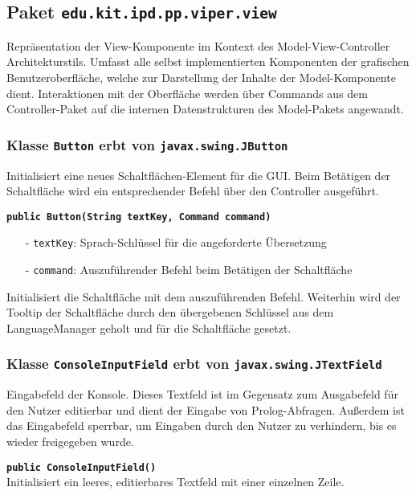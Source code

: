 \documentclass[parskip=full,11pt,twoside]{scrartcl}
\begin{document}
\subsection{Paket \texttt{edu.kit.ipd.pp.viper.view}}

Repräsentation der View-Komponente im Kontext des Model-View-Controller Architekturstils. Umfasst alle selbst implementierten Komponenten der grafischen Benutzeroberfläche, welche zur Darstellung der Inhalte der Model-Komponente dient. Interaktionen mit der Oberfläche werden über Commands aus dem Controller-Paket auf die internen Datenstrukturen des Model-Pakets angewandt.

\subsubsection{Klasse \texttt{Button} erbt von \texttt{javax.swing.JButton}}

Initialisiert eine neues Schaltflächen-Element für die GUI. Beim Betätigen der Schaltfläche wird ein entsprechender Befehl über den Controller ausgeführt.

\textbf{\texttt{public Button(String textKey, Command command)}}
\begin{itemize}[noitemsep]
	\item[-] \texttt{textKey}: Sprach-Schlüssel für die angeforderte Übersetzung
	\item[-] \texttt{command}: Auszuführender Befehl beim Betätigen der Schaltfläche
\end{itemize}
Initialisiert die Schaltfläche mit dem auszuführenden Befehl. Weiterhin wird der Tooltip der Schaltfläche durch den übergebenen Schlüssel aus dem LanguageManager geholt und für die Schaltfläche gesetzt.

\subsubsection{Klasse \texttt{ConsoleInputField} erbt von \texttt{javax.swing.JTextField}}

Eingabefeld der Konsole. Dieses Textfeld ist im Gegensatz zum Ausgabefeld für den Nutzer editierbar und dient der Eingabe von Prolog-Abfragen. Außerdem ist das Eingabefeld sperrbar, um Eingaben durch den Nutzer zu verhindern, bis es wieder freigegeben wurde.

\textbf{\texttt{public ConsoleInputField()}}\\
Initialisiert ein leeres, editierbares Textfeld mit einer einzelnen Zeile.
\end{document}
